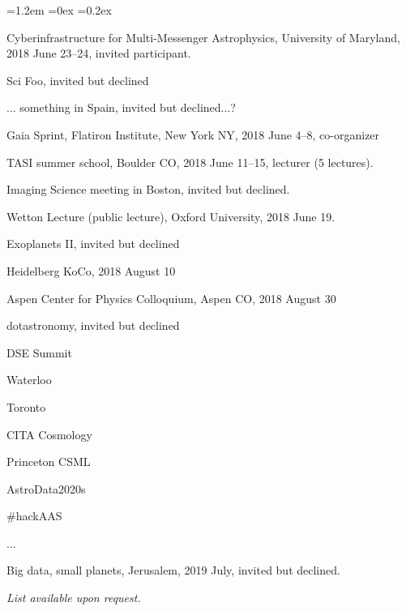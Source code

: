 \documentclass[10pt,letterpaper]{article}
\newcounter{refpubnum}
\newcommand{\hogglist}{%
    \rightmargin=0in
    \leftmargin=1.2em
    \topsep=0ex
    \partopsep=0pt
    \itemsep=0.2ex
    \parsep=0pt
    \itemindent=-1.0\leftmargin
    \listparindent=0.0\leftmargin
    \settowidth{\labelsep}{~}
    \usecounter{refpubnum}
  }
\begin{document}
\begin{list}{}{\hogglist}
{\item Cyberinfrastructure for Multi-Messenger Astrophysics, University of Maryland, 2018 June 23--24, invited participant.
\item Sci Foo, invited but declined
\item ... something in Spain, invited but declined...?
\item Gaia Sprint, Flatiron Institute, New York NY, 2018 June 4--8, co-organizer
\item TASI summer school, Boulder CO, 2018 June 11--15, lecturer (5 lectures).
\item Imaging Science meeting in Boston, invited but declined.
\item Wetton Lecture (public lecture), Oxford University, 2018 June 19.
\item Exoplanets II, invited but declined
\item Heidelberg KoCo, 2018 August 10
\item Aspen Center for Physics Colloquium, Aspen CO, 2018 August 30
\item dotastronomy, invited but declined
\item DSE Summit
\item Waterloo
\item Toronto
\item CITA Cosmology
\item Princeton CSML
\item AstroData2020s
\item #hackAAS
\item ...
\item Big data, small planets, Jerusalem, 2019 July, invited but declined.
}{%
\item \textit{List available upon request.}
}%
\end{list}
\end{document}
